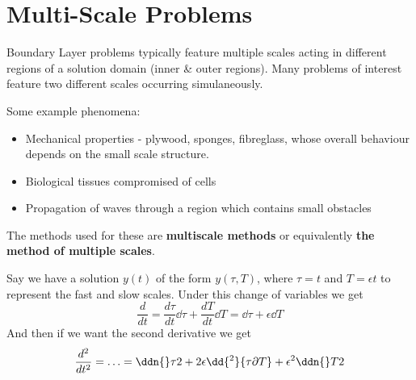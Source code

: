 \documentclass{X:/Documents/Coding/Latex/myassignment}
\begin{document}





\section{Multi-Scale Problems}

Boundary Layer problems typically feature multiple scales acting in different regions of a solution domain (inner \& outer regions). Many problems of interest feature two different scales occurring simulaneously. 

Some example phenomena:
\begin{itemize}
     \item Mechanical properties - plywood, sponges, fibreglass, whose overall behaviour depends on the small scale structure.
     \item Biological tissues compromised of cells
     \item Propagation of waves through a region which contains small obstacles
\end{itemize} 


The methods used for these are \textbf{multiscale methods} or equivalently \textbf{the method of multiple scales}.

Say we have a solution $y(t)$ of the form $y(\tau,T)$, where $\tau =t$ and $T = \epsilon t$ to represent the fast and slow scales. Under this change of variables we get
\[\frac{d}{dt} = \frac{d\tau}{dt} \dd{}\tau + \frac{dT}{dt} \dd{}T = \dd{}\tau + \epsilon \dd{}T\]
And then if we want the second derivative we get
\[\frac{d^2}{dt^2} = \ldots = \ddn{}\tau2 + 2\epsilon \dd{^2}{\tau\partial T} + \epsilon^2 \ddn{}T2\]
\end{document}
